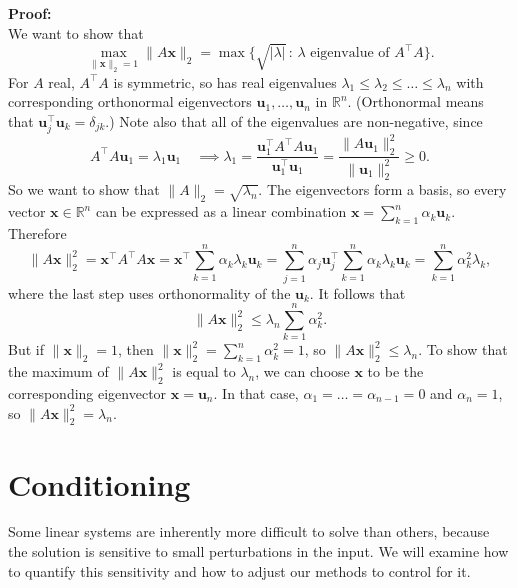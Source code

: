 \documentclass[
  letterpaper,
  DIV=11,
  numbers=noendperiod]{scrreprt}
\begin{document}
\textbf{Proof:}\\
We want to show that \[
\max_{\|\mathbf{x}\|_2 = 1}\|A\mathbf{x}\|_2  = \max\{\sqrt{|\lambda|} \,: \,\textrm{$\lambda$ eigenvalue of $A^\top A$} \}.
\] For \(A\) real, \(A^\top A\) is symmetric, so has real eigenvalues
\(\lambda_1 \leq\lambda_2 \leq \ldots \leq \lambda_n\) with
corresponding orthonormal eigenvectors
\(\mathbf{u}_1, \ldots,\mathbf{u}_n\) in \(\mathbb{R}^n\). (Orthonormal
means that \(\mathbf{u}_j^\top \mathbf{u}_k = \delta_{jk}\).) Note also
that all of the eigenvalues are non-negative, since \[
A^\top A\mathbf{u}_1 = \lambda_1\mathbf{u}_1 \quad \implies \lambda_1 = \frac{\mathbf{u}_1^\top A^\top A\mathbf{u}_1}{\mathbf{u}_1^\top\mathbf{u}_1} = \frac{\|A\mathbf{u}_1\|_2^2}{\|\mathbf{u}_1\|_2^2} \geq 0.
\] So we want to show that \(\|A\|_2=\sqrt{\lambda_n}\). The
eigenvectors form a basis, so every vector \(\mathbf{x}\in\mathbb{R}^n\)
can be expressed as a linear combination
\(\mathbf{x} = \sum_{k=1}^n\alpha_k\mathbf{u}_k\). Therefore \[
\|A\mathbf{x}\|_2^2 = \mathbf{x}^\top A^\top A\mathbf{x} = \mathbf{x}^\top\sum_{k=1}^n\alpha_k\lambda_k\mathbf{u}_k = \sum_{j=1}^n\alpha_j\mathbf{u}_j^\top\sum_{k=1}^n\alpha_k\lambda_k\mathbf{u}_k = \sum_{k=1}^n\alpha_k^2\lambda_k,
\] where the last step uses orthonormality of the \(\mathbf{u}_k\). It
follows that \[
\|A\mathbf{x}\|_2^2 \leq \lambda_n\sum_{k=1}^n\alpha_k^2.
\] But if \(\|\mathbf{x}\|_2=1\), then
\(\|\mathbf{x}\|_2^2=\sum_{k=1}^n\alpha_k^2 = 1\), so
\(\|A\mathbf{x}\|_2^2 \leq \lambda_n\). To show that the maximum of
\(\|A\mathbf{x}\|_2^2\) is equal to \(\lambda_n\), we can choose
\(\mathbf{x}\) to be the corresponding eigenvector
\(\mathbf{x}=\mathbf{u}_n\). In that case,
\(\alpha_1=\ldots=\alpha_{n-1}=0\) and \(\alpha_n=1\), so
\(\|A\mathbf{x}\|_2^2 =\lambda_n\).

\section{Conditioning}\label{conditioning}

Some linear systems are inherently more difficult to solve than others,
because the solution is sensitive to small perturbations in the input.
We will examine how to quantify this sensitivity and how to adjust our
methods to control for it.
\end{document}
